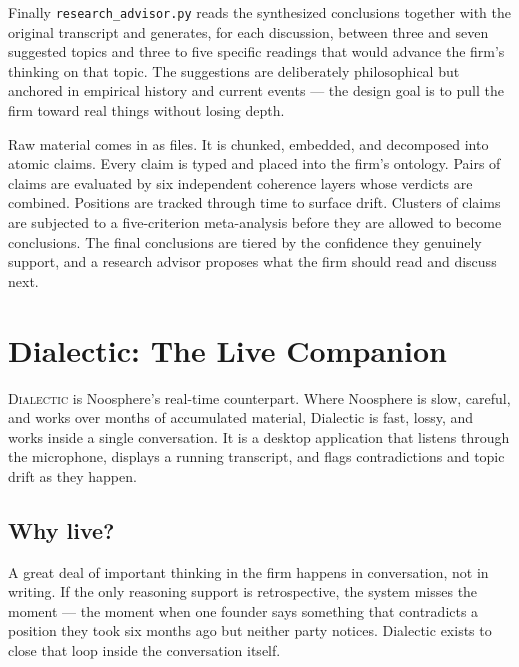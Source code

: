 \documentclass[11pt]{article}
\begin{document}
Finally \texttt{research\_advisor.py} reads the synthesized conclusions together with the original transcript and generates, for each discussion, between three and seven suggested topics and three to five specific readings that would advance the firm's thinking on that topic. The suggestions are deliberately philosophical but anchored in empirical history and current events --- the design goal is to pull the firm toward real things without losing depth.

\begin{componentbox}
Raw material comes in as files. It is chunked, embedded, and decomposed into atomic claims. Every claim is typed and placed into the firm's ontology. Pairs of claims are evaluated by six independent coherence layers whose verdicts are combined. Positions are tracked through time to surface drift. Clusters of claims are subjected to a five-criterion meta-analysis before they are allowed to become conclusions. The final conclusions are tiered by the confidence they genuinely support, and a research advisor proposes what the firm should read and discuss next.
\end{componentbox}

\clearpage

\section{Dialectic: The Live Companion}

\textsc{Dialectic} is Noosphere's real-time counterpart. Where Noosphere is slow, careful, and works over months of accumulated material, Dialectic is fast, lossy, and works inside a single conversation. It is a desktop application that listens through the microphone, displays a running transcript, and flags contradictions and topic drift as they happen.

\subsection{Why live?}

A great deal of important thinking in the firm happens in conversation, not in writing. If the only reasoning support is retrospective, the system misses the moment --- the moment when one founder says something that contradicts a position they took six months ago but neither party notices. Dialectic exists to close that loop inside the conversation itself.
\end{document}
